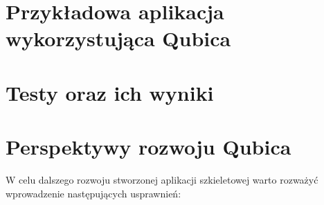 \documentclass[12pt]{report}
\begin{document}
\section{Przykładowa aplikacja wykorzystująca Qubica}

\section{Testy oraz ich wyniki}

\section{Perspektywy rozwoju Qubica}

W celu dalszego rozwoju stworzonej aplikacji szkieletowej warto rozważyć wprowadzenie następujących usprawnień:
\end{document}
